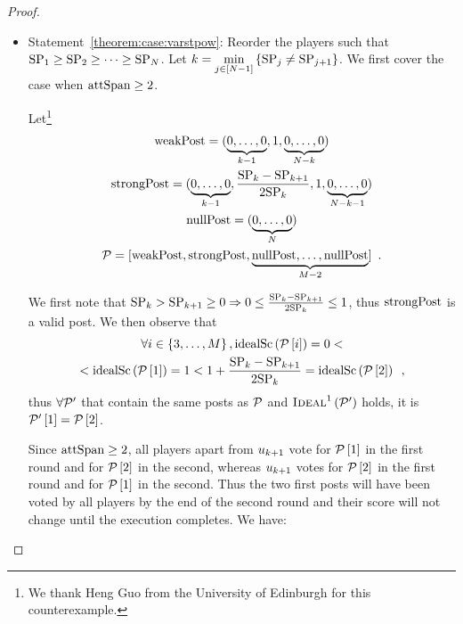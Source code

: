 \begin{proof}
  \begin{itemize}
    \item Statement~\ref{theorem:case:varstpow}: Reorder the players such that
    $\mathrm{SP}_1 \geq \mathrm{SP}_2 \geq \dots \geq \mathrm{SP}_{N}$. Let $k =
    \min\limits_{j \in \left[N - 1\right]}\left\{\mathrm{SP}_j \neq
    \mathrm{SP}_{j+1}\right\}$. We first cover the case when $\mathrm{attSpan} \geq 2$.

    Let\footnote{We thank Heng Guo from the University of Edinburgh for this
    counterexample.}
    \begin{gather*}
      \mathrm{weakPost} = (\underbrace{0, \dots, 0}_{k - 1}, 1, \underbrace{0,
      \dots, 0}_{N - k}) \\
      \mathrm{strongPost} = (\underbrace{0, \dots, 0}_{k - 1}, \frac{\mathrm{SP}_k -
      \mathrm{SP}_{k + 1}}{2\mathrm{SP}_k}, 1, \underbrace{0, \dots, 0}_{N - k -
      1}) \\
      \mathrm{nullPost} = (\underbrace{0, \dots, 0}_{N}) \\
      \mathcal{P} = [\mathrm{weakPost}, \mathrm{strongPost}, \underbrace{\mathrm{nullPost}, \dots,
      \mathrm{nullPost}}_{M - 2}] \enspace.
    \end{gather*}

    We first note that $\mathrm{SP}_k > \mathrm{SP}_{k+1} \geq 0 \Rightarrow 0 \leq
    \frac{\mathrm{SP}_k - \mathrm{SP}_{k + 1}}{2\mathrm{SP}_k} \leq 1$, thus $\mathrm{strongPost}$ is a
    valid post. We then observe that
    \begin{gather*}
      \forall i \in \left\{3, \dots, M\right\},
      \mathrm{idealSc}\left(\mathcal{P}\left[i\right]\right) = 0 < \\
      <\mathrm{idealSc}\left(\mathcal{P}\left[1\right]\right) = 1 < 1 + \frac{\mathrm{SP}_k -
      \mathrm{SP}_{k+1}}{2\mathrm{SP}_k} = \mathrm{idealSc}\left(\mathcal{P}\left[2\right]\right) \enspace,
    \end{gather*}
    thus $\forall \mathcal{P}'$ that contain the same posts as $\mathcal{P}$ and
    $\textsc{Ideal}^1\left(\mathcal{P}'\right)$ holds, it is
    $\mathcal{P}'\left[1\right] = \mathcal{P}\left[2\right]$.

    Since $\mathrm{attSpan} \geq 2$, all players apart from $u_{k + 1}$ vote for
    $\mathcal{P}\left[1\right]$ in the first round and for
    $\mathcal{P}\left[2\right]$ in the second, whereas $u_{k + 1}$ votes for
    $\mathcal{P}\left[2\right]$ in the first round and for
    $\mathcal{P}\left[1\right]$ in the second. Thus the two first posts will have
    been voted by all players by the end of the second round and their score
    will not change until the execution completes. We have:


\end{itemize}
\end{proof}
